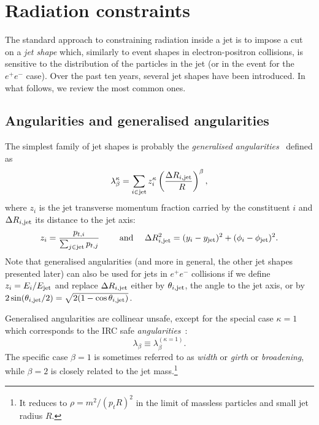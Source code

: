 \section{Radiation constraints}\label{sec:tools-radiation-constraints}

The standard approach to constraining radiation inside a jet is to
impose a cut on a {\em jet shape} which, similarly to event shapes in
electron-positron collisions, is sensitive to the distribution of the particles in the jet
(or in the event for the $e^+e^-$ case).
%
Over the past ten years, several jet shapes have been introduced. In what follows,  we
review the most common ones.

\subsection{Angularities and generalised angularities}\label{sec:def-angularities}

The simplest family of jet shapes is probably the {\em generalised
  angularities}~\cite{Larkoski:2014pca} defined as
\begin{equation}\label{eq:generalised-angularities}
  \lambda_\beta^\kappa = \sum_{i\in{\text{jet}}} z_i^\kappa
    \left(\frac{\Delta R_{i,{\text{jet}}}}{\\R}\right)^\beta,
\end{equation}
where $z_i$ is the jet transverse momentum fraction carried by the
constituent $i$ and $\Delta R_{i,{\text{jet}}}$ its distance to the jet axis:
\begin{equation}
  z_i = \frac{p_{t,i}}{\sum_{j\in{\text{jet}}}p_{t,j}}
  \qquad\text{ and }\quad
  \Delta R_{i,{\text{jet}}}^2 = (y_i- y_{{\text{jet}}})^2 + (\phi_i- \phi_{{\text{jet}}})^2.
\end{equation}
Note that generalised angularities (and more in general, the other jet shapes
presented later) can also be used for jets in $e^+e^-$
collisions if we define $z_i=E_i/E_{\text{jet}}$ and replace
$\Delta R_{i,{\text{jet}}}$ either by $\theta_{i,{\text{jet}}}$, the angle to the jet
axis, or by
$2\sin(\theta_{i,{\text{jet}}}/2)=\sqrt{2(1-\cos \theta_{i,{\text{jet}}})}$.

Generalised angularities are collinear unsafe, except for the special
case $\kappa=1$ which corresponds to the IRC safe 
{\em angularities}~\cite{Berger:2003iw,Almeida:2008yp}:
\begin{equation}\label{eq:angularities}
\lambda_\beta \equiv \lambda_\beta^{(\kappa=1)}.
\end{equation}
The specific case $\beta=1$ is sometimes referred to as {\em width} or
{\em girth} or {\em broadening}, while $\beta=2$ is closely related to
the jet mass.\footnote{It reduces to $\rho=m^2/(p_tR)^2$ in the limit
  of massless particles and small jet radius $R$.}


